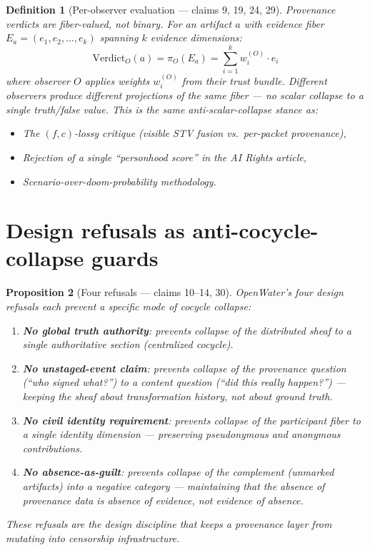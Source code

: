 \documentclass[11pt,a4paper]{article}
\newtheorem{definition}{Definition}[section]
\newtheorem{proposition}[definition]{Proposition}
\begin{document}
\begin{definition}[Per-observer evaluation --- claims 9, 19, 24, 29]
\label{def:observer}
Provenance verdicts are fiber-valued, not binary. For an artifact $a$
with evidence fiber $E_a = (e_1, e_2, \ldots, e_k)$ spanning $k$
evidence dimensions:
\[
  \text{Verdict}_O(a) = \pi_O(E_a) = \sum_{i=1}^{k} w_i^{(O)} \cdot e_i
\]
where observer $O$ applies weights $w_i^{(O)}$ from their trust bundle.
Different observers produce different projections of the same fiber ---
no scalar collapse to a single truth/false value. This is the same
anti-scalar-collapse stance as:
\begin{itemize}
\item The $(f,c)$-lossy critique (visible STV fusion vs.\ per-packet
  provenance),
\item Rejection of a single ``personhood score'' in the AI Rights
  article,
\item Scenario-over-doom-probability methodology.
\end{itemize}
\end{definition}

\section{Design refusals as anti-cocycle-collapse guards}
\label{sec:refusals}

\begin{proposition}[Four refusals --- claims 10--14, 30]
\label{prop:refusals}
OpenWater's four design refusals each prevent a specific mode of
cocycle collapse:
\begin{enumerate}
\item \textbf{No global truth authority}: prevents collapse of
  the distributed sheaf to a single authoritative section
  (centralized cocycle).
\item \textbf{No unstaged-event claim}: prevents collapse of the
  provenance question (``who signed what?'') to a content question
  (``did this really happen?'') --- keeping the sheaf about
  transformation history, not about ground truth.
\item \textbf{No civil identity requirement}: prevents collapse
  of the participant fiber to a single identity dimension ---
  preserving pseudonymous and anonymous contributions.
\item \textbf{No absence-as-guilt}: prevents collapse of the
  complement (unmarked artifacts) into a negative category ---
  maintaining that the absence of provenance data is absence of
  evidence, not evidence of absence.
\end{enumerate}
These refusals are the design discipline that keeps a provenance layer
from mutating into censorship infrastructure.
\end{proposition}
\end{document}
